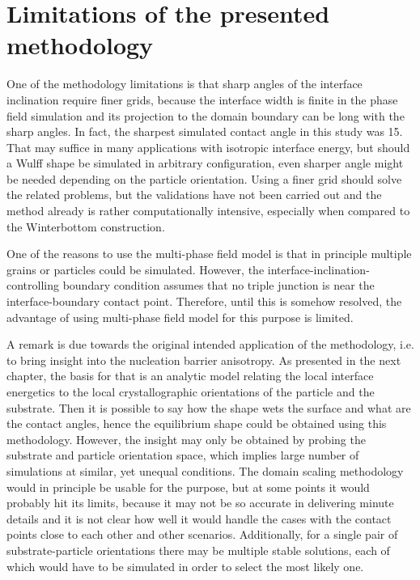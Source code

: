 \section{Limitations of the presented methodology}
One of the methodology limitations is that sharp angles of the interface inclination require finer grids, because the interface width is finite in the phase field simulation and its projection to the domain boundary can be long with the sharp angles. In fact, the sharpest simulated contact angle in this study was 15\textdegree. That may suffice in many applications with isotropic interface energy, but should a Wulff shape be simulated in arbitrary configuration, even sharper angle might be needed depending on the particle orientation. Using a finer grid should solve the related problems, but the validations have not been carried out and the method already is rather computationally intensive, especially when compared to the Winterbottom construction.

One of the reasons to use the multi-phase field model is that in principle multiple grains or particles could be simulated. However, the interface-inclination-controlling boundary condition assumes that no triple junction is near the interface-boundary contact point. Therefore, until this is somehow resolved, the advantage of using multi-phase field model for this purpose is limited. 

A remark is due towards the original intended application of the methodology, i.e. to bring insight into the nucleation barrier anisotropy. As presented in the next chapter, the basis for that is an analytic model relating the local interface energetics to the local crystallographic orientations of the particle and the substrate. Then it is possible to say how the shape wets the surface and what are the contact angles, hence the equilibrium shape could be obtained using this methodology. However, the insight may only be obtained by probing the substrate and particle orientation space, which implies large number of simulations at similar, yet unequal conditions. The domain scaling methodology would in principle be usable for the purpose, but at some points it would probably hit its limits, because it may not be so accurate in delivering minute details and it is not clear how well it would handle the cases with the contact points close to each other and other scenarios. Additionally, for a single pair of substrate-particle orientations there may be multiple stable solutions, each of which would have to be simulated in order to select the most likely one. 

